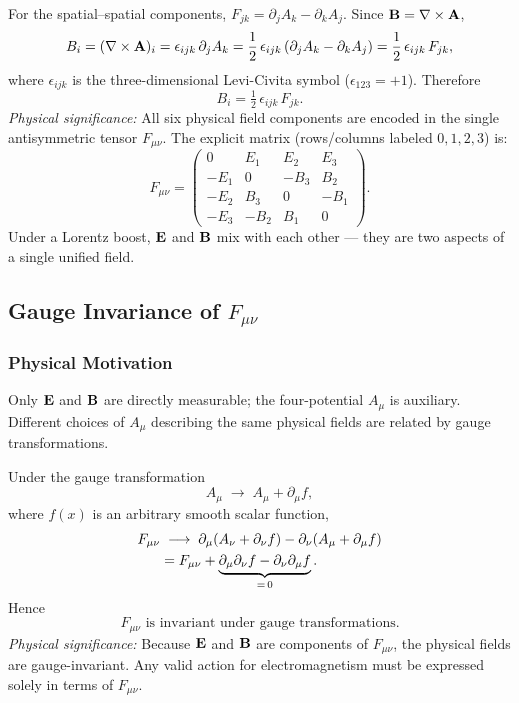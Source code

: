 For the spatial--spatial components, $F_{jk} = \partial_j A_k - \partial_k A_j$.  Since $\mathbf{B} = \nabla\times\mathbf{A}$,
\begin{equation}
  B_i = (\nabla\times\mathbf{A})_i = \epsilon_{ijk}\,\partial_j A_k
  = \frac{1}{2}\,\epsilon_{ijk}\,(\partial_j A_k - \partial_k A_j)
  = \frac{1}{2}\,\epsilon_{ijk}\,F_{jk},
\end{equation}
where $\epsilon_{ijk}$ is the three-dimensional Levi-Civita symbol ($\epsilon_{123}=+1$).  Therefore
\begin{equation}\label{eq:B-from-F}
  \boxed{B_i = \tfrac{1}{2}\,\epsilon_{ijk}\,F_{jk}.}
\end{equation}
\textit{Physical significance:} All six physical field components are encoded in the single antisymmetric tensor $F_{\mu\nu}$.  The explicit matrix (rows/columns labeled $0,1,2,3$) is:
\begin{equation}\label{eq:F-matrix}
  F_{\mu\nu} =
  \begin{pmatrix}
    0    &  E_1  &  E_2  &  E_3 \\
   -E_1  &  0    & -B_3  &  B_2 \\
   -E_2  &  B_3  &  0    & -B_1 \\
   -E_3  & -B_2  &  B_1  &  0
  \end{pmatrix}.
\end{equation}
Under a Lorentz boost, $\mathbf{E}$ and $\mathbf{B}$ mix with each other — they are two aspects of a single unified field.

\subsection{Gauge Invariance of $F_{\mu\nu}$}\label{subsec:gauge}

\subsubsection*{Physical Motivation}
Only $\mathbf{E}$ and $\mathbf{B}$ are directly measurable; the four-potential $A_\mu$ is auxiliary.  Different choices of $A_\mu$ describing the same physical fields are related by gauge transformations.

Under the gauge transformation
\begin{equation}
  A_\mu \;\longrightarrow\; A_\mu + \partial_\mu f,
\end{equation}
where $f(x)$ is an arbitrary smooth scalar function,
\begin{align}
  F_{\mu\nu} &\;\longrightarrow\;
    \partial_\mu(A_\nu + \partial_\nu f) - \partial_\nu(A_\mu + \partial_\mu f) \notag\\
  &= F_{\mu\nu} + \underbrace{\partial_\mu\partial_\nu f - \partial_\nu\partial_\mu f}_{=\,0}.
\end{align}
Hence
\begin{equation}\label{eq:gauge-inv}
  \boxed{F_{\mu\nu} \text{ is invariant under gauge transformations.}}
\end{equation}
\textit{Physical significance:} Because $\mathbf{E}$ and $\mathbf{B}$ are components of $F_{\mu\nu}$, the physical fields are gauge-invariant.  Any valid action for electromagnetism must be expressed solely in terms of $F_{\mu\nu}$.

